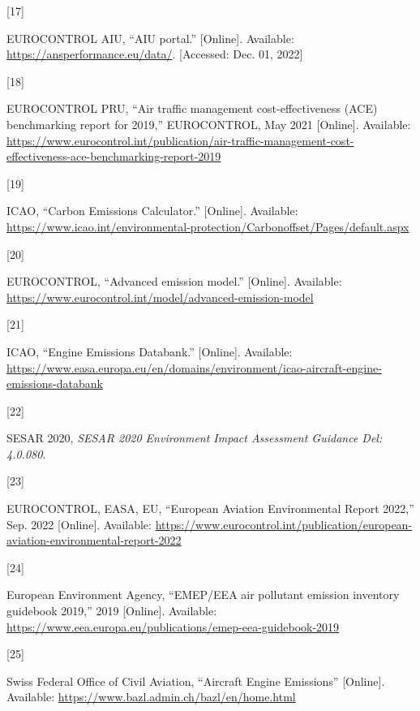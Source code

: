 \documentclass[
  11pt,
  a4paper,
]{book}
\newlength{\cslhangindent}
\newlength{\csllabelwidth}
\newlength{\cslentryspacingunit} %
\newenvironment{CSLReferences}[2] %
 {%
  \setlength{\parindent}{0pt}
  \ifodd #1
  \let\oldpar\par
  \def\par{\hangindent=\cslhangindent\oldpar}
  \fi
  \setlength{\parskip}{#2\cslentryspacingunit}
 }%
 {}
\newcommand{\CSLLeftMargin}[1]{\parbox[t]{\csllabelwidth}{#1}}
\newcommand{\CSLRightInline}[1]{\parbox[t]{\linewidth - \csllabelwidth}{#1}\break}
\begin{document}
\begin{CSLReferences}{0}{0}
\leavevmode{}%
\CSLLeftMargin{{[}17{]} }%
\CSLRightInline{EUROCONTROL AIU, {``{AIU} portal.''} {[}Online{]}.
Available: \url{https://ansperformance.eu/data/}. {[}Accessed: Dec. 01,
2022{]}}

\leavevmode{}%
\CSLLeftMargin{{[}18{]} }%
\CSLRightInline{EUROCONTROL PRU, {``Air traffic management
cost-effectiveness ({ACE}) benchmarking report for 2019,''}
{EUROCONTROL}, May 2021 {[}Online{]}. Available:
\url{https://www.eurocontrol.int/publication/air-traffic-management-cost-effectiveness-ace-benchmarking-report-2019}}

\leavevmode{}%
\CSLLeftMargin{{[}19{]} }%
\CSLRightInline{ICAO, {``Carbon {Emissions Calculator}.''} {[}Online{]}.
Available:
\url{https://www.icao.int/environmental-protection/Carbonoffset/Pages/default.aspx}}

\leavevmode{}%
\CSLLeftMargin{{[}20{]} }%
\CSLRightInline{EUROCONTROL, {``Advanced emission model.''}
{[}Online{]}. Available:
\url{https://www.eurocontrol.int/model/advanced-emission-model}}

\leavevmode{}%
\CSLLeftMargin{{[}21{]} }%
\CSLRightInline{ICAO, {``Engine {Emissions Databank}.''} {[}Online{]}.
Available:
\url{https://www.easa.europa.eu/en/domains/environment/icao-aircraft-engine-emissions-databank}}

\leavevmode{}%
\CSLLeftMargin{{[}22{]} }%
\CSLRightInline{SESAR 2020, \emph{{SESAR} 2020 \textendash{}
{Environment Impact Assessment Guidance Del}: 4.0.080}. }

\leavevmode{}%
\CSLLeftMargin{{[}23{]} }%
\CSLRightInline{EUROCONTROL, EASA, EU, {``European {Aviation
Environmental Report} 2022,''} Sep. 2022 {[}Online{]}. Available:
\url{https://www.eurocontrol.int/publication/european-aviation-environmental-report-2022}}

\leavevmode{}%
\CSLLeftMargin{{[}24{]} }%
\CSLRightInline{European Environment Agency, {``{EMEP}/{EEA} air
pollutant emission inventory guidebook 2019,''} 2019 {[}Online{]}.
Available:
\url{https://www.eea.europa.eu/publications/emep-eea-guidebook-2019}}

\leavevmode{}%
\CSLLeftMargin{{[}25{]} }%
\CSLRightInline{Swiss Federal Office of Civil Aviation, {``Aircraft
{Engine Emissions}''} {[}Online{]}. Available:
\url{https://www.bazl.admin.ch/bazl/en/home.html}}


\end{CSLReferences}
\end{document}
